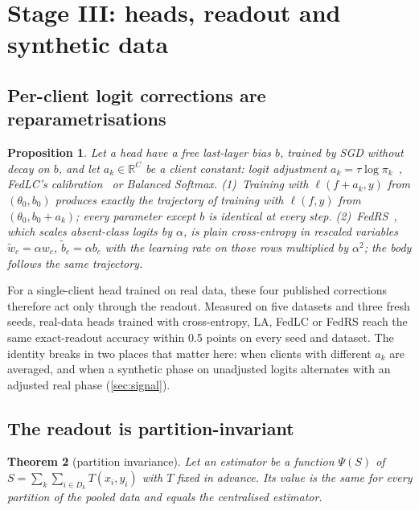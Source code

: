\documentclass[10pt]{article}
\theoremstyle{plain}
\newtheorem{theorem}{Theorem}
\newtheorem{proposition}[theorem]{Proposition}
\theoremstyle{definition}
\newcommand{\R}{\mathbb{R}}
\begin{document}
\section{Stage III: heads, readout and synthetic data}\label{sec:heads}

\subsection{Per-client logit corrections are reparametrisations}

\begin{proposition}\label{prop:reparam}
Let a head have a free last-layer bias $b$, trained by SGD without decay on $b$, and let $a_k\in\R^C$ be a client
constant: logit adjustment $a_k=\tau\log\pi_k$~\cite{menon2021logit}, FedLC's calibration~\cite{zhang2022fedlc} or
Balanced Softmax. (1)~Training with $\ell(f+a_k,y)$ from $(\theta_0,b_0)$ produces exactly the trajectory of training
with $\ell(f,y)$ from $(\theta_0,b_0+a_k)$; every parameter except $b$ is identical at every step. (2)~FedRS~\cite{li2021fedrs},
which scales absent-class logits by $\alpha$, is plain cross-entropy in rescaled variables $\tilde w_c=\alpha w_c$,
$\tilde b_c=\alpha b_c$ with the learning rate on those rows multiplied by $\alpha^2$; the body follows the same trajectory.
\end{proposition}

For a single-client head trained on real data, these four published corrections therefore act only through the
readout. Measured on five datasets and three fresh seeds, real-data heads trained with cross-entropy, LA, FedLC or
FedRS reach the same exact-readout accuracy within 0.5 points on every seed and dataset. The identity breaks in two
places that matter here: when clients with different $a_k$ are averaged, and when a synthetic phase on unadjusted
logits alternates with an adjusted real phase (\cref{sec:signal}).

\subsection{The readout is partition-invariant}

\begin{theorem}[partition invariance]\label{thm:invariance}
Let an estimator be a function $\Psi(S)$ of $S=\sum_k\sum_{i\in D_k}T(x_i,y_i)$ with $T$ fixed in advance. Its value is
the same for every partition of the pooled data and equals the centralised estimator.
\end{theorem}
\end{document}

